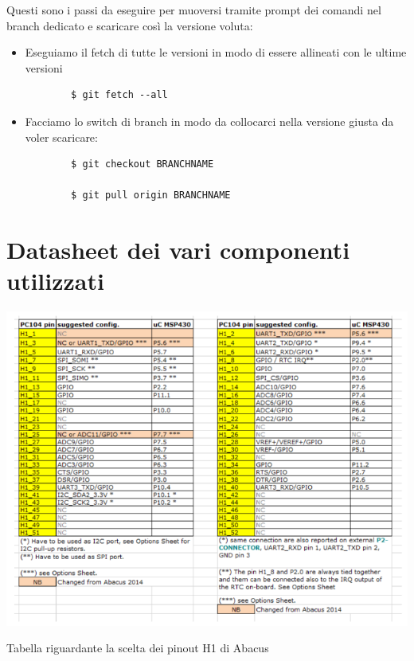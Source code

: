 \documentclass[LaM,binding=0.6cm]{../sapthesis}
\begin{document}
Questi sono i passi da eseguire per muoversi tramite prompt dei comandi nel branch dedicato e scaricare così la versione voluta:

\begin{itemize}
    \item Eseguiamo il fetch di tutte le versioni in modo di essere allineati con le ultime versioni

    \begin{verbatim}
        $ git fetch --all
    \end{verbatim}

     \item Facciamo lo switch di branch in modo da collocarci nella versione giusta da voler scaricare:
     
    \begin{verbatim}
        $ git checkout BRANCHNAME
        
        $ git pull origin BRANCHNAME
    \end{verbatim}
     
\end{itemize}

\chapter{Datasheet dei vari componenti utilizzati}

    \begin{table}[htbp]
    \centerline{\includegraphics[scale=.85]{examples/datasheet/abacusDatasheet7.PNG}}
    \caption{Tabella riguardante la scelta dei pinout H1 di Abacus}
    \label{fig}
    \end{table}
    
\end{document}
